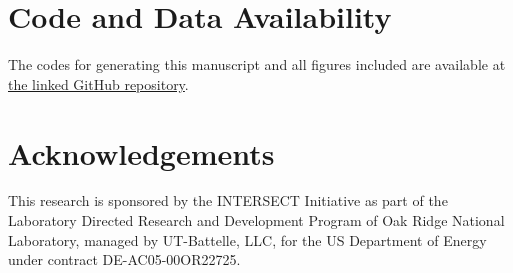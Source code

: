 \documentclass[aip, amsmath, amssymb, nobibnotes, nofootinbib, citeautoscript, reprint, superscriptaddress]{revtex4-1}
\begin{document}
    \section*{Code and Data Availability}

    The codes for generating this manuscript and all figures included are available at \href{https://github.com/jacobhinkle/hex_interlacing}{the linked GitHub repository}. 

    \section*{\label{sec:acknowledgement}Acknowledgements}

    This research is sponsored by the INTERSECT Initiative as part of the Laboratory Directed Research and Development Program of Oak Ridge National Laboratory, managed by UT-Battelle, LLC, for the US Department of Energy under contract DE-AC05-00OR22725. 

    
\end{document}
